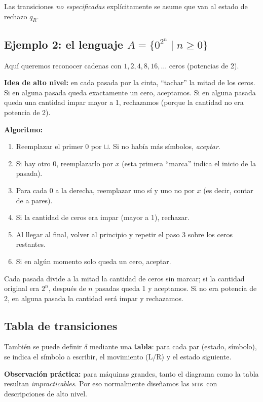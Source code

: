 \documentclass[11pt,a4paper]{article}
\theoremstyle{definicion}
\newcommand{\MTs}{\textsc{mt}s}
\newcommand{\bl}{\sqcup}
\begin{document}
Las transiciones \emph{no especificadas} explícitamente se asume que van al estado de rechazo $q_R$.

\subsection{Ejemplo 2: el lenguaje $A = \{0^{2^n} \mid n \geq 0\}$}

Aquí queremos reconocer cadenas con $1, 2, 4, 8, 16, \dots$ ceros (potencias de 2).

\textbf{Idea de alto nivel:} en cada pasada por la cinta, ``tachar'' la mitad de los ceros. Si en alguna pasada queda exactamente un cero, aceptamos. Si en alguna pasada queda una cantidad impar mayor a 1, rechazamos (porque la cantidad no era potencia de 2).

\textbf{Algoritmo:}
\begin{enumerate}
    \item Reemplazar el primer $0$ por $\bl$. Si no había más símbolos, \emph{aceptar}.
    \item Si hay otro $0$, reemplazarlo por $x$ (esta primera ``marca'' indica el inicio de la pasada).
    \item Para cada $0$ a la derecha, reemplazar uno sí y uno no por $x$ (es decir, contar de a pares).
    \item Si la cantidad de ceros era impar (mayor a 1), rechazar.
    \item Al llegar al final, volver al principio y repetir el paso 3 sobre los ceros restantes.
    \item Si en algún momento solo queda un cero, aceptar.
\end{enumerate}

Cada pasada divide a la mitad la cantidad de ceros sin marcar; si la cantidad original era $2^n$, después de $n$ pasadas queda 1 y aceptamos. Si no era potencia de 2, en alguna pasada la cantidad será impar y rechazamos.

\subsection{Tabla de transiciones}

También se puede definir $\delta$ mediante una \textbf{tabla}: para cada par (estado, símbolo), se indica el símbolo a escribir, el movimiento (L/R) y el estado siguiente.

\textbf{Observación práctica:} para máquinas grandes, tanto el diagrama como la tabla resultan \emph{impracticables}. Por eso normalmente diseñamos las \MTs\ con descripciones de alto nivel.
\end{document}
